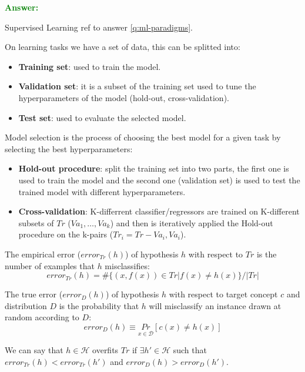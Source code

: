 \documentclass[12pt]{article}
\begin{document}
\begin{enumerate}[label=\textbf{ML.\arabic*}]
    \textcolor{green}{\textbf{Answer:}}

    Supervised Learning ref to answer \ref{q:ml-paradigms}.
    
    On learning tasks we have a set of data, this can be splitted into:
    \begin{itemize}
        \item \textbf{Training set}: used to train the model.
        \item \textbf{Validation set}: it is a subset of the training set used to tune the hyperparameters of the model (hold-out, cross-validation).
        \item \textbf{Test set}: used to evaluate the selected model.
    \end{itemize}

    Model selection is the process of choosing the best model for a given task by selecting the best hyperparameters:
    \begin{itemize}
        \item \textbf{Hold-out procedure}: split the training set into two parts, the first one is used to train the model and
        the second one (validation set) is used to test the trained model with different hyperparameters.
        \item \textbf{Cross-validation}: K-differrent classifier/regressors are trained on K-different subsets of $Tr$ ($Va_1,\ldots,Va_k$)
        and then is iteratively applied the Hold-out procedure on the k-pairs ($Tr_i=Tr-Va_i,Va_i$).
    \end{itemize}

    The empirical error ($error_{Tr}(h)$) of hypothesis $h$ with respect to $Tr$ is the number of examples that $h$ misclassifies:
    \begin{equation}\label{eq:empirical_error}
        error_{Tr}(h) = \#\{(x,f(x)) \in Tr|f(x)\neq h(x)\}/|Tr|
    \end{equation}

    The true error ($error_D(h)$) of hypothesis $h$ with respect to target concept $c$ and distribution $D$ is the probability that $h$ will misclassify an instance drawn at random according to $D$:
    \begin{equation}\label{eq:true_error}
        error_D(h) \equiv \underset{x\in\mathcal{D}}{Pr}[c(x)\neq h(x)]
    \end{equation}

    We can say that $h\in\mathcal{H}$ overfits $Tr$ if $\exists h'\in\mathcal{H}$ such that $error_{Tr}(h)<error_{Tr}(h')$ and $error_D(h)>error_D(h')$.


\end{enumerate}
\end{document}
